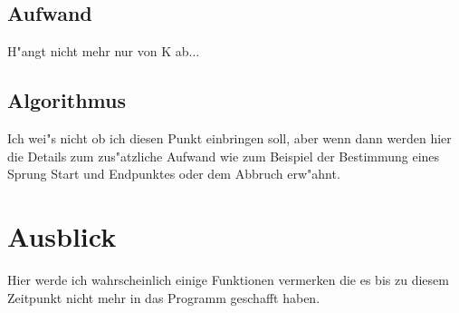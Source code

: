 \documentclass[11pt, a4paper, german]{article}
\begin{document}
	\subsection{Aufwand}
	H"angt nicht mehr nur von K ab...
	
	\subsection{Algorithmus}
	Ich wei"s nicht ob ich diesen Punkt einbringen soll, aber wenn dann werden hier die Details zum zus"atzliche Aufwand wie zum Beispiel der Bestimmung eines Sprung Start und Endpunktes oder dem Abbruch erw"ahnt.
	
	
\clearpage
\section{Ausblick}
Hier werde ich wahrscheinlich einige Funktionen vermerken die es bis zu diesem Zeitpunkt nicht mehr in das Programm geschafft haben.


\clearpage

\end{document}
